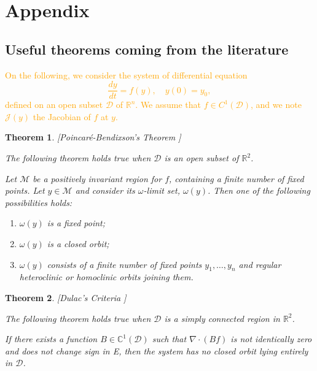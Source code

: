 \documentclass{article}
\newcommand{\vdeux}[1]{\textcolor{orange}{#1}}
\newtheorem{theorem}{Theorem}
\theoremstyle{definition}
\theoremstyle{remark}
\begin{document}
\newpage
\section*{Appendix}
\begin{appendix}
\section{Useful theorems coming from the literature} \label{sec:litterature theorems}
\vdeux{
On the following, we consider the system of differential equation
\begin{equation}
\dfrac{dy}{dt} = f(y), \quad y(0) = y_0,
\label{equation:generic system}
\end{equation}
defined on an open subset $\mathcal{D}$ of $\mathbb{R}^n$. We assume that $f \in C^1(\mathcal{D})$, and we note $\mathcal{J}(y)$ the Jacobian of $f$ at $y$.}

\begin{theorem}  \label{theorem:Poincaré-Bendixson} [Poincaré-Bendixson's Theorem  \cite{wiggins_introduction_2003}]

The following theorem holds true when $\mathcal{D}$ is an open subset of $\mathbb R ^2$.

Let $\mathcal{M}$ be a positively invariant region for $f$, containing a finite number of fixed points. Let $y \in \mathcal{M}$ and consider its $\omega$-limit set, $\omega(y)$. Then one of the following possibilities holds:
\begin{enumerate}
\item $\omega(y)$ is a fixed point;
\item $\omega(y)$ is a closed orbit;
\item $\omega(y)$ consists of a finite number of fixed points $y_1, \ldots, y_n$ and regular heteroclinic or homoclinic orbits joining them.
\end{enumerate}
\end{theorem}

\begin{theorem} \label{theorem:Dulac} [Dulac's Criteria \cite{perko_differential_1996}]

The following theorem holds true when $\mathcal{D}$ is a simply connected region in $\mathbb R ^2$. 

If there exists a function $B \in \mathbb{C}^1(\mathcal{D})$ such that $\nabla \cdot (Bf)$ is not identically zero and does not change sign in E, then the system has no closed orbit lying entirely in $\mathcal{D}$.
\end{theorem}


\end{appendix}
\end{document}
